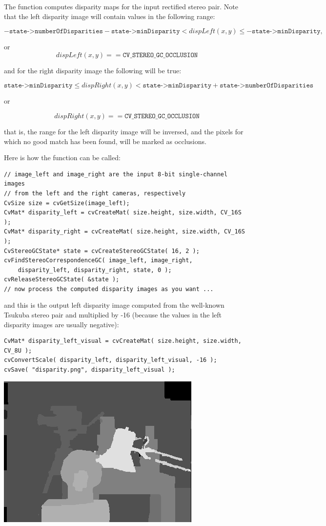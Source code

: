 The function computes disparity maps for the input rectified stereo pair. Note that the left disparity image will contain values in the following range: 

\[
-\texttt{state->numberOfDisparities}-\texttt{state->minDisparity}
< dispLeft(x,y) \le -\texttt{state->minDisparity},
\]

or
\[
dispLeft(x,y) == \texttt{CV\_STEREO\_GC\_OCCLUSION}
\]

and for the right disparity image the following will be true: 

\[
\texttt{state->minDisparity} \le dispRight(x,y) 
< \texttt{state->minDisparity} + \texttt{state->numberOfDisparities}
\]

or

\[
dispRight(x,y) == \texttt{CV\_STEREO\_GC\_OCCLUSION}
\]

that is, the range for the left disparity image will be inversed,
and the pixels for which no good match has been found, will be marked
as occlusions.

Here is how the function can be called:

\begin{lstlisting}
// image_left and image_right are the input 8-bit single-channel images
// from the left and the right cameras, respectively
CvSize size = cvGetSize(image_left);
CvMat* disparity_left = cvCreateMat( size.height, size.width, CV_16S );
CvMat* disparity_right = cvCreateMat( size.height, size.width, CV_16S );
CvStereoGCState* state = cvCreateStereoGCState( 16, 2 );
cvFindStereoCorrespondenceGC( image_left, image_right,
    disparity_left, disparity_right, state, 0 );
cvReleaseStereoGCState( &state );
// now process the computed disparity images as you want ...
\end{lstlisting}

and this is the output left disparity image computed from the well-known Tsukuba stereo pair and multiplied by -16 (because the values in the left disparity images are usually negative): 

\begin{lstlisting}
CvMat* disparity_left_visual = cvCreateMat( size.height, size.width, CV_8U );
cvConvertScale( disparity_left, disparity_left_visual, -16 );
cvSave( "disparity.png", disparity_left_visual );
\end{lstlisting}

\includegraphics{pics/disparity.png}

